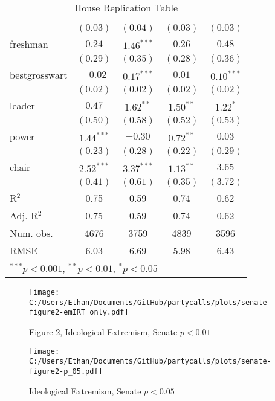 \documentclass[12pt]{article}
\begin{document}
\begin{table}
\begin{center}
\begin{tabular}{l c c c c }
			& $(0.03)$      & $(0.04)$      & $(0.03)$      & $(0.03)$      \\
			freshman               & $0.24$        & $1.46^{***}$  & $0.26$        & $0.48$        \\
			& $(0.29)$      & $(0.35)$      & $(0.28)$      & $(0.36)$      \\
			bestgrosswart          & $-0.02$       & $0.17^{***}$  & $0.01$        & $0.10^{***}$  \\
			& $(0.02)$      & $(0.02)$      & $(0.02)$      & $(0.02)$      \\
			leader                 & $0.47$        & $1.62^{**}$   & $1.50^{**}$   & $1.22^{*}$    \\
			& $(0.50)$      & $(0.58)$      & $(0.52)$      & $(0.53)$      \\
			power                  & $1.44^{***}$  & $-0.30$       & $0.72^{**}$   & $0.03$        \\
			& $(0.23)$      & $(0.28)$      & $(0.22)$      & $(0.29)$      \\
			chair                  & $2.52^{***}$  & $3.37^{***}$  & $1.13^{**}$   & $3.65$        \\
			& $(0.41)$      & $(0.61)$      & $(0.35)$      & $(3.72)$      \\
			\hline
			R$^2$                  & 0.75          & 0.59          & 0.74          & 0.62          \\
			Adj. R$^2$             & 0.75          & 0.59          & 0.74          & 0.62          \\
			Num. obs.              & 4676          & 3759          & 4839          & 3596          \\
			RMSE                   & 6.03          & 6.69          & 5.98          & 6.43          \\
			\hline
			\multicolumn{5}{l}{\scriptsize{$^{***}p<0.001$, $^{**}p<0.01$, $^*p<0.05$}}
		\end{tabular}
		\caption{House Replication Table}
	\end{center}
\end{table}

\begin{figure}[ht]
	\caption{Figure 2, Ideological Extremism, Senate $ p < 0.01 $}
	\centering
	\texttt{[image: C:/Users/Ethan/Documents/GitHub/partycalls/plots/senate-figure2-emIRT\_only.pdf]}
	
\end{figure}

\begin{figure}[ht]
	\caption{Ideological Extremism, Senate $ p < 0.05 $}
	\centering
	\texttt{[image: C:/Users/Ethan/Documents/GitHub/partycalls/plots/senate-figure2-p\_05.pdf]}
	
\end{figure}
\end{document}
